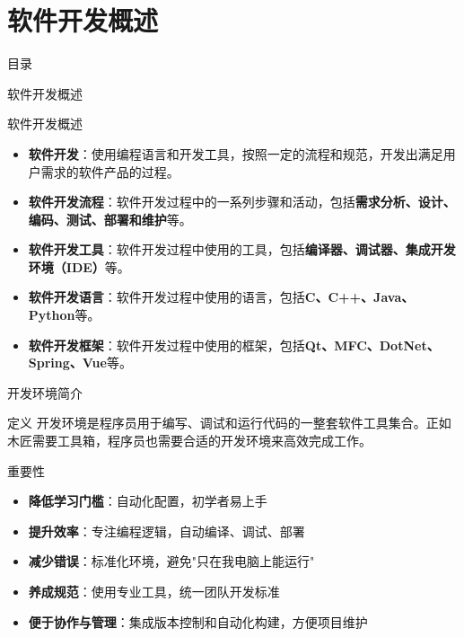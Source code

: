 \documentclass[UTF8,aspectratio=169]{beamer}
\begin{document}
\section{软件开发概述}
\begin{frame}{目录}
    \begin{multicols}{2}
        \tableofcontents[currentsection]
    \end{multicols}
\end{frame}

\begin{frame}{软件开发概述}
    \begin{ytublock}{软件开发概述}
        \begin{itemize}
            \item \textbf{软件开发}：使用编程语言和开发工具，按照一定的流程和规范，开发出满足用户需求的软件产品的过程。
            \item \textbf{软件开发流程}：软件开发过程中的一系列步骤和活动，包括\textbf{需求分析、设计、编码、测试、部署和维护}等。
            \item \textbf{软件开发工具}：软件开发过程中使用的工具，包括\textbf{编译器、调试器、集成开发环境（IDE）}等。
            \item \textbf{软件开发语言}：软件开发过程中使用的语言，包括\textbf{C、C++、Java、Python}等。
            \item \textbf{软件开发框架}：软件开发过程中使用的框架，包括\textbf{Qt、MFC、DotNet、Spring、Vue}等。
        \end{itemize}
    \end{ytublock}
\end{frame}

\begin{frame}{开发环境简介}
    \begin{ytublock}{定义}
        开发环境是程序员用于编写、调试和运行代码的一整套软件工具集合。正如木匠需要工具箱，程序员也需要合适的开发环境来高效完成工作。
    \end{ytublock}

    \begin{ytublock}{重要性}
        \begin{itemize}
            \item \textbf{降低学习门槛}：自动化配置，初学者易上手
            \item \textbf{提升效率}：专注编程逻辑，自动编译、调试、部署
            \item \textbf{减少错误}：标准化环境，避免"只在我电脑上能运行"
            \item \textbf{养成规范}：使用专业工具，统一团队开发标准
            \item \textbf{便于协作与管理}：集成版本控制和自动化构建，方便项目维护
        \end{itemize}
    \end{ytublock}
\end{frame}
\end{document}
